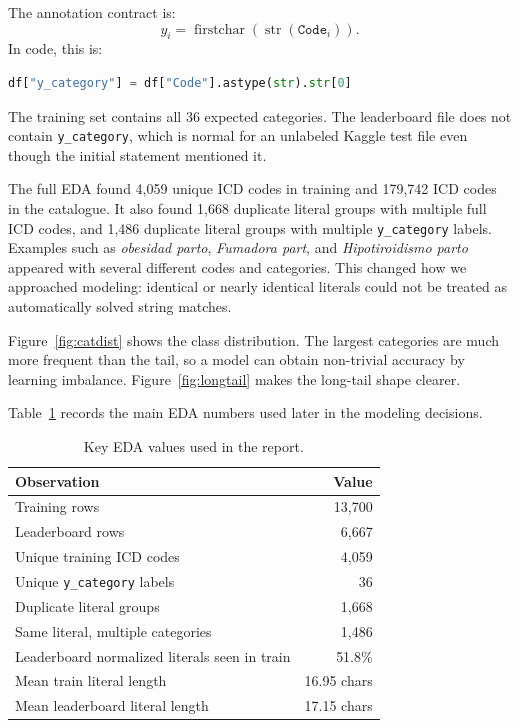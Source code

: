 \documentclass[10pt,a4paper,twocolumn]{article}
\begin{document}
The annotation contract is:
\begin{equation}
y_i = \operatorname{firstchar}(\operatorname{str}(\texttt{Code}_i)).
\end{equation}
In code, this is:
\begin{lstlisting}[language=Python]
df["y_category"] = df["Code"].astype(str).str[0]
\end{lstlisting}

The training set contains all 36 expected categories. The leaderboard file does not contain \texttt{y\_category}, which is normal for an unlabeled Kaggle test file even though the initial statement mentioned it.

The full EDA found 4,059 unique ICD codes in training and 179,742 ICD codes in the catalogue. It also found 1,668 duplicate literal groups with multiple full ICD codes, and 1,486 duplicate literal groups with multiple \texttt{y\_category} labels. Examples such as \emph{obesidad parto}, \emph{Fumadora part}, and \emph{Hipotiroidismo parto} appeared with several different codes and categories. This changed how we approached modeling: identical or nearly identical literals could not be treated as automatically solved string matches.

Figure~\ref{fig:catdist} shows the class distribution. The largest categories are much more frequent than the tail, so a model can obtain non-trivial accuracy by learning imbalance. Figure~\ref{fig:longtail} makes the long-tail shape clearer.

Table~\ref{tab:eda} records the main EDA numbers used later in the modeling decisions.

\begin{table}[h]
\centering
\caption{Key EDA values used in the report.}
\label{tab:eda}
\begin{tabularx}{\columnwidth}{Xr}
\toprule
Observation & Value \\
\midrule
Training rows & 13,700 \\
Leaderboard rows & 6,667 \\
Unique training ICD codes & 4,059 \\
Unique \texttt{y\_category} labels & 36 \\
Duplicate literal groups & 1,668 \\
Same literal, multiple categories & 1,486 \\
Leaderboard normalized literals seen in train & 51.8\% \\
Mean train literal length & 16.95 chars \\
Mean leaderboard literal length & 17.15 chars \\
\bottomrule
\end{tabularx}
\end{table}
\end{document}
